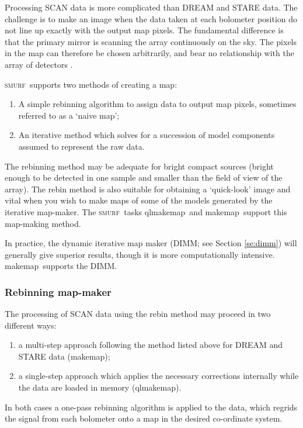 \documentclass[twoside,11pt]{article}
\newcommand{\xref}[3]{#1}
\newcommand{\xlabel}[1]{}
\renewcommand{\_}{\texttt{\symbol{95}}}
\newcommand{\SMURF}{\textsc{smurf}}
\newcommand{\task}[1]{\textsf{#1}}
\newcommand{\qlmakemap}{\xref{\task{qlmakemap}}{sun258}{QLMAKEMAP}}
\newcommand{\makemap}{\xref{\task{makemap}}{sun258}{MAKEMAP}}
\begin{document}
Processing SCAN data is more complicated than DREAM and STARE data.
The challenge is to make an image when the data taken at each
bolometer position do not line up exactly with the output map
pixels. The fundamental difference is that the primary mirror is
scanning the array continuously on the sky. The pixels in the map can
therefore be chosen arbitrarily, and bear no relationship with the
array of detectors \cite{sc2ana001,sc2ana005,sc2ana006}.

\SMURF\ supports two methods of creating a map:
\begin{enumerate}
\item A simple rebinning algorithm to assign data to output map
  pixels, sometimes referred to as a `naive map';
\item An iterative method which solves for a succession of model
  components assumed to represent the raw data.
\end{enumerate}

The rebinning method may be adequate for bright compact sources
(bright enough to be detected in one sample and smaller than the field
of view of the array). The rebin method is also suitable for obtaining
a `quick-look' image and vital when you wish to make maps of some of
the models generated by the iterative map-maker. The \SMURF\ tasks
\qlmakemap\ and \makemap\ support this map-making method.

In practice, the dynamic iterative map maker (DIMM; see Section
\ref{se:dimm}) will generally give superior results, though it is more
computationally intensive. \makemap\ supports the DIMM.

\subsubsection{\xlabel{rebin}Rebinning map-maker\label{se:rebin}}

The processing of SCAN data using the rebin method may proceed in two
different ways:
\begin{enumerate}
\item a multi-step approach following the method listed above for
  DREAM and STARE data (\makemap);
\item a single-step approach which applies the necessary
  corrections internally while the data are loaded in memory
  (\qlmakemap).
\end{enumerate}
In both cases a one-pass rebinning algorithm is applied to the data,
which regrids the signal from each bolometer onto a map in the desired
co-ordinate system.
\end{document}
